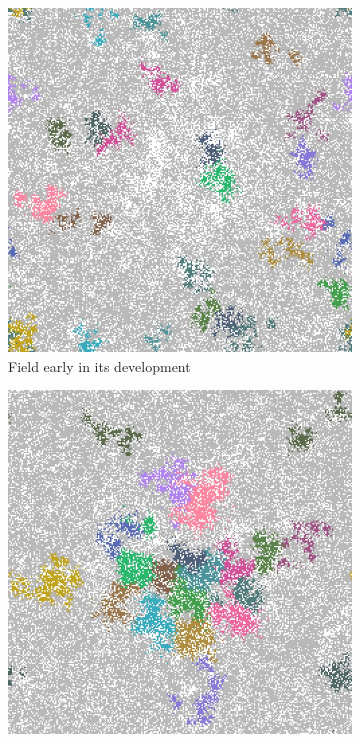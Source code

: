 \documentclass[\main/thesis.tex]{subfiles}
\begin{document}
\begin{figure}[H]
\begin{subfigure}[t]{.45\textwidth}
      \includegraphics[width=\textwidth]{images/2_GeneralObservations/Fig6/2_early_field_1000.jpeg}
      \caption{Field early in its development}
      \label{fig:GeneralObservations_earlyFieldLineages}
    \end{subfigure}
    \begin{subfigure}[t]{.45\textwidth}
      \centering
      \includegraphics[width=\textwidth]{images/2_GeneralObservations/Fig6/3_late_field_1400.jpeg}

\end{subfigure}
\end{figure}
\end{document}
